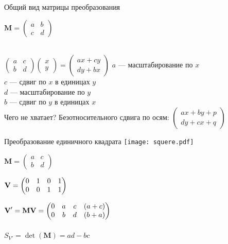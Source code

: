 \documentclass[10pt]{beamer}
\begin{document}
    \begin{frame}{Общий вид матрицы преобразования}
    	
    	{
    		\centering
    		
    		$   \textbf{M}=
    			\begin{pmatrix}
    				a&b\\
    				c&d
    			\end{pmatrix}
    		$ \\ ~ \\
    	}
    	
    	{
    		 $
    		\begin{pmatrix}
    			a&c\\
    			b&d
    		\end{pmatrix}
    		\begin{pmatrix}
    			x\\
    			y
    		\end{pmatrix}
    		=
    		\begin{pmatrix}
    			ax+cy \\
    			dy+bx
    		\end{pmatrix}
    		$
    	}
    	{
    		$a$ --- масштабирование по $x$ \\
    		$c$ --- сдвиг по $x$ в единицах $y$\\
    		$d$ --- масштабирование по $y$\\
    		$b$ --- сдвиг по $y$ в единицах $x$
    	} 
    	\hfil \\[2em]
    	
    	Чего не хватает? Безотносительного сдвига по осям:     		
    	$
    	\begin{pmatrix}
    		ax+by+p \\
    		dy+cx+q
    	\end{pmatrix}
    	$    	
    	
    	
    \end{frame}
    
    \begin{frame}{Преобразование единичного квадрата}
    	{
    		\texttt{[image: squere.pdf]}
    	}
    	{
    		$\mathbf M =  
    		\begin{pmatrix}
    			a&c\\
    			b&d
    		\end{pmatrix}$
    		
    		$\textbf V = 
    		\begin{pmatrix}
    			0 & 1 & 0 & 1\\
    			0& 0 & 1 & 1
    		\end{pmatrix}$
    		
    		$
    		\textbf V'=\mathbf{MV}=
    		\begin{pmatrix}
    			0 & a & c & (a+c) \\
    			0 & b & d & (b+a)
    		\end{pmatrix}
    		$ \\~\\
    		$S_{V'} = \det(\mathbf M) = ad-bc$
    	}
    \end{frame}
    
\end{document}
